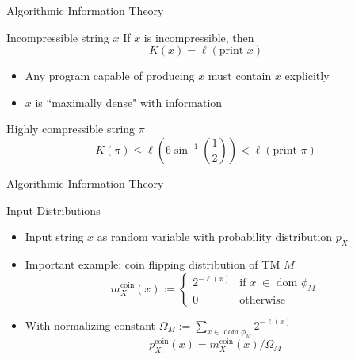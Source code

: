 \begin{frame}{Algorithmic Information Theory}
\begin{block}{Incompressible string $x$}
If $x$ is incompressible, then 
\begin{equation*}
    K(x) = \ell(\text{print }x)
\end{equation*}
\begin{itemize}
    \item Any program capable of producing $x$ must contain $x$ explicitly
    \item $x$ is ``maximally dense" with information
\end{itemize}
\end{block}
 \begin{block}{Highly compressible string $\pi$}
    \begin{equation*}
        K(\pi) \le \ell \left( 6\sin^{-1}\left(\frac{1}{2}\right)\right) < \ell( \text{print }\pi)
    \end{equation*}
    \end{block}
\end{frame}

\begin{frame}{Algorithmic Information Theory}
\begin{block}{Input Distributions}
\begin{itemize}
    \item Input string $x$ as random variable with probability distribution $p_X$
    \item Important example: coin flipping distribution of TM $M$
    \begin{equation*}
        m_X^\text{coin}(x) := \begin{cases} 2^{-\ell(x)} &\text{if $x\;\in$ dom $\phi_M$}\\ 0 &\text{otherwise}\end{cases}
    \end{equation*}
    \item With normalizing constant $\Omega_M :=\sum_{x\in\text{ dom }\phi_M} 2^{-\ell(x)}$
    \begin{equation*}
        p_X^\text{coin}(x) = m_X^\text{coin}(x)/\Omega_M
    \end{equation*}
\end{itemize}
\end{block}
\end{frame}

